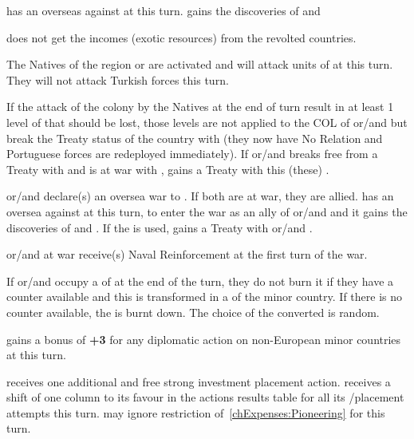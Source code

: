 \phdipl
\aparag \TUR has an overseas \CB against \POR at this turn. \TUR gains the
discoveries of  and 

\phadm
\POR does not get the incomes (exotic resources) from the revolted countries.

\phmil
\aparag The Natives of the region \granderegionOman or \granderegionAden are
activated and will attack units of \POR at this turn. They will not attack
Turkish forces this turn.

\phinter
\aparag If the attack of the colony by the Natives at the end of turn result
in at least 1 level of \COL that should be lost, those levels are not applied
to the COL of \paysOman or/and \paysAden but break the Treaty status of the
country with \POR (they now have No Relation and Portuguese forces are
redeployed immediately).
\aparag If \paysOman or/and \paysAden breaks free from a Treaty with \POR and
\TUR is at war with \POR, \TUR gains a Treaty with this (these) \MIN.



\phevnt
\aparag \paysOman or/and \paysAden declare(s) an oversea war to \POR. If both
are at war, they are allied.
\aparag \TUR has an oversea \CB against \POR at this turn, to enter the war as
an ally of \paysOman or/and \paysAden and it gains the discoveries of
 and .  If the \CB is used, \TUR gains a
Treaty with \paysOman or/and \paysAden.

\phadm
\aparag \paysOman or/and \paysAden at war receive(s) Naval Reinforcement at
the first turn of the war.

\phinter
\aparag If \paysOman or/and \paysAden occupy a \TP of \POR at the end of the
turn, they do not burn it if they have a \TP counter available and this \TP is
transformed in a \TP of the minor country. If there is no counter available,
the \TP is burnt down. The choice of the \TP converted is random.




\phdipl
\aparag \POR gains a bonus of {\bf +3} for any diplomatic action on
non-European minor countries at this turn.

\phadm
\aparag \POR receives one additional and free strong investment \TP placement
action.
\aparag \POR receives a shift of one column to its favour in the actions
results table for all its \COL/\TP placement attempts this turn.
\aparag \POR may ignore restriction of~\ref{chExpenses:Pioneering} for this
turn.



